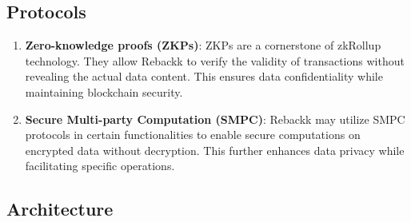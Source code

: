 \documentclass[12pt]{article}
\begin{document}
\subsection{Protocols}
\begin{enumerate}
    \item \textbf{Zero-knowledge proofs (ZKPs)}: ZKPs are a cornerstone of zkRollup technology. They allow Rebackk to verify the validity of transactions without revealing the actual data content. This ensures data confidentiality while maintaining blockchain security.
    \item \textbf{Secure Multi-party Computation (SMPC)}: Rebackk may utilize SMPC protocols in certain functionalities to enable secure computations on encrypted data without decryption. This further enhances data privacy while facilitating specific operations.
\end{enumerate}

\subsection{Architecture}
\label{fig:architecture}
\newpage
\end{document}
